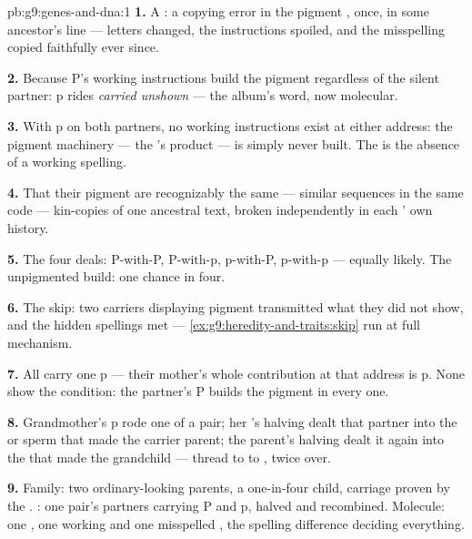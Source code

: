 \begin{solution}{pb:g9:genes-and-dna:1}
\textbf{1.} A : a copying error in the pigment
, once, in some ancestor's  line --- letters
changed, the instructions spoiled, and the misspelling
copied faithfully ever since.

\textbf{2.} Because P's working instructions build the
pigment regardless of the silent partner: p rides
\emph{carried unshown} --- the album's word, now
molecular.

\textbf{3.} With p on both partners, no working
instructions exist at either address: the pigment
machinery --- the 's product --- is simply never
built. The  is the absence of a working spelling.

\textbf{4.} That their pigment  are recognizably the
same  --- similar sequences in the same code ---
kin-copies of one ancestral text, broken independently in
each ' own history.

\textbf{5.} The four deals: P-with-P, P-with-p, p-with-P,
p-with-p --- equally likely. The unpigmented build:
one chance in four.

\textbf{6.} The skip: two carriers displaying pigment
transmitted what they did not show, and the hidden
spellings met --- \cref{ex:g9:heredity-and-traits:skip}
run at full mechanism.

\textbf{7.} All carry one p --- their mother's whole
contribution at that address is p. None show the
condition: the partner's P builds the pigment in every
one.

\textbf{8.} Grandmother's p rode one  of a
pair; her 's halving dealt that partner into the
 or sperm that made the carrier parent; the parent's
halving dealt it again into the  that made the
grandchild --- thread to  to , twice over.

\textbf{9.} Family: two ordinary-looking parents, a
one-in-four child, carriage proven by the .
: one pair's partners carrying P and p, halved
and recombined. Molecule: one , one working and one
misspelled , the spelling difference deciding
everything.


\end{solution}
